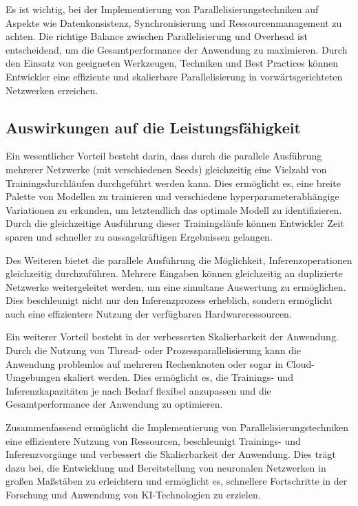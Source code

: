 Es ist wichtig, bei der Implementierung von Parallelisierungstechniken auf Aspekte wie Datenkonsistenz, Synchronisierung und Ressourcenmanagement zu achten. Die richtige Balance zwischen Parallelisierung und Overhead ist entscheidend, um die Gesamtperformance der Anwendung zu maximieren. Durch den Einsatz von geeigneten Werkzeugen, Techniken und Best Practices können Entwickler eine effiziente und skalierbare Parallelisierung in vorwärtsgerichteten Netzwerken erreichen.

\subsection{Auswirkungen auf die Leistungsfähigkeit}
\label{sec:Grundlagen_Parallelisierung_Leistungsfähigkeit}
Ein wesentlicher Vorteil besteht darin, dass durch die parallele Ausführung mehrerer Netzwerke (mit verschiedenen Seeds) gleichzeitig eine Vielzahl von Trainingsdurchläufen durchgeführt werden kann. Dies ermöglicht es, eine breite Palette von Modellen zu trainieren und verschiedene hyperparameterabhängige Variationen zu erkunden, um letztendlich das optimale Modell zu identifizieren. Durch die gleichzeitige Ausführung dieser Trainingsläufe können Entwickler Zeit sparen und schneller zu aussagekräftigen Ergebnissen gelangen.

Des Weiteren bietet die parallele Ausführung die Möglichkeit, Inferenzoperationen gleichzeitig durchzuführen. Mehrere Eingaben können gleichzeitig an duplizierte Netzwerke weitergeleitet werden, um eine simultane Auswertung zu ermöglichen. Dies beschleunigt nicht nur den Inferenzprozess erheblich, sondern ermöglicht auch eine effizientere Nutzung der verfügbaren Hardwareressourcen.

Ein weiterer Vorteil besteht in der verbesserten Skalierbarkeit der Anwendung. Durch die Nutzung von Thread- oder Prozessparallelisierung kann die Anwendung problemlos auf mehreren Rechenknoten oder sogar in Cloud-Umgebungen skaliert werden. Dies ermöglicht es, die Trainings- und Inferenzkapazitäten je nach Bedarf flexibel anzupassen und die Gesamtperformance der Anwendung zu optimieren.

Zusammenfassend ermöglicht die Implementierung von Parallelisierungstechniken eine effizientere Nutzung von Ressourcen, beschleunigt Trainings- und Inferenzvorgänge und verbessert die Skalierbarkeit der Anwendung. Dies trägt dazu bei, die Entwicklung und Bereitstellung von neuronalen Netzwerken in großen Maßstäben zu erleichtern und ermöglicht es, schnellere Fortschritte in der Forschung und Anwendung von KI-Technologien zu erzielen.
